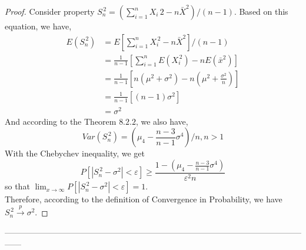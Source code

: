 \begin{proof}[Proof]
   Consider property $ S_n^{\,2}=(\sum_{i=1}^n X_i{\,2}-n\bar{X}^2)/(n-1).$ Based on this equation, we have,
    \begin{align*}
     E(S_n^{\,2})&=E[\sum_{i=1}^n X_i^{\,2}-n\bar{X}^2]/(n-1)\\
                &=\frac{1}{n-1}[\sum_{i=1}^nE(X_i^{\,2})-nE(\bar{x}^2)]\\
                &=\frac{1}{n-1}[n(\mu^2+\sigma^2)-n(\mu^2+\frac{\sigma^2}{n})]\\
                &=\frac{1}{n-1}[(n-1)\sigma^2]\\
                &=\sigma^2
     \end{align*}
   And according to the Theorem $8.2.2$, we also have,
   $$ 
   Var(S_n^{\,2})=(\mu_4-\frac{n-3}{n-1}\sigma^4)/n, n>1
   $$
   With the Chebychev inequality, we get
    $$ 
    P[|S_n^{\,2}-\sigma^2|<\varepsilon]\geq\frac{1-(\mu_4-\frac{n-3}{n-1}\sigma^4)}{\varepsilon^2n}
    $$
    so that $\lim_{x \to \infty}P[|S_n^{\,2}-\sigma^2|<\varepsilon]=1.$\\
Therefore, according to the definition of Convergence in Probability, we have $S_n^{\,2}\overset{p}{\to}\sigma^2.$
    
\end{proof}


------------------------------------------------------------------------------------------------------------------


%


